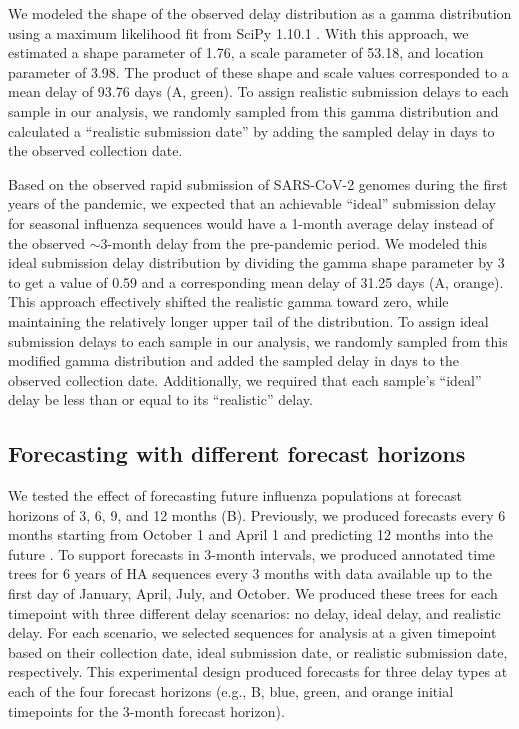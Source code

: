 \documentclass[9pt,lineno]{elife}
\begin{document}
We modeled the shape of the observed delay distribution as a gamma distribution using a maximum likelihood fit from SciPy 1.10.1 \citep{scipy}.
With this approach, we estimated a shape parameter of 1.76, a scale parameter of 53.18, and location parameter of 3.98.
The product of these shape and scale values corresponded to a mean delay of 93.76 days (A, green).
To assign realistic submission delays to each sample in our analysis, we randomly sampled from this gamma distribution and calculated a ``realistic submission date'' by adding the sampled delay in days to the observed collection date.

Based on the observed rapid submission of SARS-CoV-2 genomes during the first years of the pandemic, we expected that an achievable ``ideal'' submission delay for seasonal influenza sequences would have a 1-month average delay instead of the observed $\sim$3-month delay from the pre-pandemic period.
We modeled this ideal submission delay distribution by dividing the gamma shape parameter by 3 to get a value of 0.59 and a corresponding mean delay of 31.25 days (A, orange).
This approach effectively shifted the realistic gamma toward zero, while maintaining the relatively longer upper tail of the distribution.
To assign ideal submission delays to each sample in our analysis, we randomly sampled from this modified gamma distribution and added the sampled delay in days to the observed collection date.
Additionally, we required that each sample's ``ideal'' delay be less than or equal to its ``realistic'' delay.

\subsection{Forecasting with different forecast horizons}

We tested the effect of forecasting future influenza populations at forecast horizons of 3, 6, 9, and 12 months (B).
Previously, we produced forecasts every 6 months starting from October 1 and April 1 and predicting 12 months into the future \citep{Huddleston2020}.
To support forecasts in 3-month intervals, we produced annotated time trees for 6 years of HA sequences every 3 months with data available up to the first day of January, April, July, and October.
We produced these trees for each timepoint with three different delay scenarios: no delay, ideal delay, and realistic delay.
For each scenario, we selected sequences for analysis at a given timepoint based on their collection date, ideal submission date, or realistic submission date, respectively.
This experimental design produced forecasts for three delay types at each of the four forecast horizons (e.g., B, blue, green, and orange initial timepoints for the 3-month forecast horizon).
\end{document}
